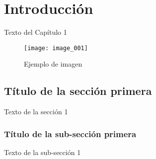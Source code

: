 
\chapter{Introducción}

Texto del Capítulo 1 \cite{Einstein-2008}

\begin{figure}[h]
  \texttt{[image: image\_001]}
  \caption{Ejemplo de imagen}
  \centering
  \label{fig:ejemplo} %
\end{figure}

\section{Título de la sección primera}

Texto de la sección 1 


\subsection{Título de la sub-sección primera}

Texto de la sub-sección 1
